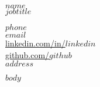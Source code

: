 \documentclass[a4paper,10pt]{article}
\begin{document}
\begin{center}
    \begin{minipage}[t]{0.6\textwidth}
        \raggedright
        {\huge \textbf{$name$}} \\ \vspace{1.0cm}%
        {\LARGE \textbf{$jobtitle$}} %
    \end{minipage}%
    \begin{minipage}[t]{0.4\textwidth}
        \raggedleft
        \href{tel:$phone$}{$phone$ \faPhone} \\ %
        \href{mailto:$email$}{$email$ \faEnvelope}\\ %
        \href{https://www.linkedin.com/in/$linkedin$}{linkedin.com/in/$linkedin$ \faLinkedin}\\ %
        \href{https://www.github.com/$github$}{github.com/$github$ \faGithub}\\
        $address$ \\ 
    \end{minipage}
\end{center}

\vspace{0.5cm} %

$body$

\end{document}
